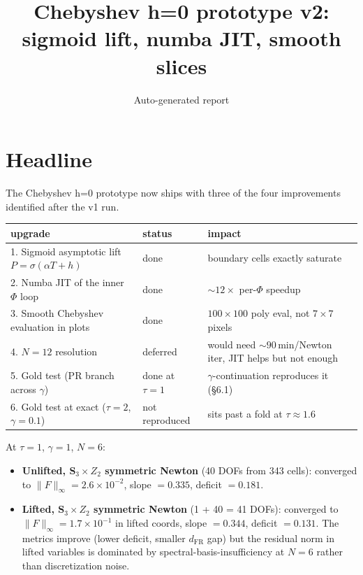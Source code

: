 \documentclass[11pt]{article}
\title{Chebyshev h=0 prototype v2:\\sigmoid lift, numba JIT, smooth slices}
\author{Auto-generated report}
\date{}
\begin{document}
\maketitle

\section*{Headline}

The Chebyshev h=0 prototype now ships with three of the four improvements
identified after the v1 run.

\begin{center}\begin{tabular}{lll}\toprule
upgrade & status & impact \\\midrule
1. Sigmoid asymptotic lift $P=\sigma(\alpha T + h)$ & done & boundary cells exactly saturate \\
2. Numba JIT of the inner $\Phi$ loop          & done & $\sim 12\times$ per-$\Phi$ speedup \\
3. Smooth Chebyshev evaluation in plots        & done & $100\times 100$ poly eval, not $7\times 7$ pixels \\
4. $N=12$ resolution                             & deferred & would need $\sim 90$\,min/Newton iter, JIT helps but not enough \\
5. Gold test (PR branch across $\gamma$)         & done at $\tau=1$ & $\gamma$-continuation reproduces it (\S 6.1) \\
6. Gold test at exact ($\tau=2$, $\gamma=0.1$)    & not reproduced & sits past a fold at $\tau\approx 1.6$ \\
\bottomrule\end{tabular}\end{center}

At $\tau=1$, $\gamma=1$, $N=6$:
\begin{itemize}
\item \textbf{Unlifted, S$_3\times Z_2$ symmetric Newton} (40 DOFs from 343 cells):
    converged to $\|F\|_\infty = 2.6\times 10^{-2}$, slope $=0.335$, deficit $=0.181$.
\item \textbf{Lifted, S$_3\times Z_2$ symmetric Newton} (1 + 40 = 41 DOFs):
    converged to $\|F\|_\infty = 1.7\times 10^{-1}$ in lifted coords, slope $=0.344$,
    deficit $=0.131$. The metrics improve (lower deficit, smaller $d_{\mathrm{FR}}$ gap)
    but the residual norm in lifted variables is dominated by spectral-basis-insufficiency
    at $N=6$ rather than discretization noise.
\end{itemize}
\end{document}
